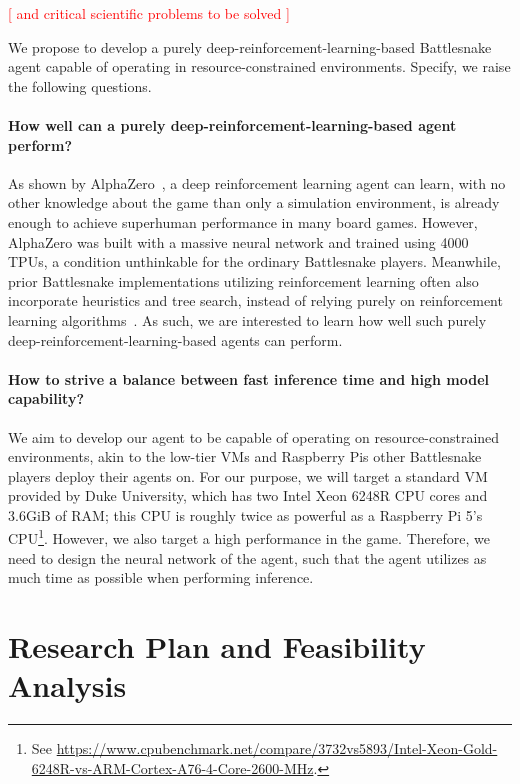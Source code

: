 \documentclass[a4paper]{article}
\newcommand{\todo}[1]{\textcolor{red}{[ #1 ]}}
\begin{document}
\todo{and critical scientific problems to be solved}

We propose to develop a purely deep-reinforcement-learning-based Battlesnake
agent capable of operating in resource-constrained environments. Specify,
we raise the following questions.

\paragraph{How well can a purely deep-reinforcement-learning-based agent
    perform?
} As shown by AlphaZero~\cite{silver2017mastering},
a deep reinforcement learning agent can learn,
with no other knowledge about the game than only a simulation environment,
is already enough to achieve superhuman performance in many board games.
However,
AlphaZero was built with a massive neural network and trained using 4000 TPUs,
a condition unthinkable for the ordinary Battlesnake players. Meanwhile,
prior Battlesnake implementations utilizing reinforcement learning often also
incorporate heuristics and tree search,
instead of relying purely on reinforcement learning
algorithms~\cite{chung2020battlesnake,binnersley2020battlesnake}. As such,
we are interested to learn how well such purely
deep-reinforcement-learning-based agents can perform.

\paragraph{How to strive a balance between fast inference time and high model
    capability?
}
We aim to develop our agent to be capable of operating on resource-constrained
environments,
akin to the low-tier VMs and Raspberry Pis other Battlesnake players deploy
their agents on. For our purpose,
we will target a standard VM provided by Duke University,
which has two Intel Xeon 6248R CPU cores and 3.6GiB of RAM;
this CPU is roughly twice as powerful as a Raspberry Pi 5's CPU\footnote{See
    \url{https://www.cpubenchmark.net/compare/3732vs5893/Intel-Xeon-Gold-6248R-vs-ARM-Cortex-A76-4-Core-2600-MHz}.
}. However, we also target a high performance in the game. Therefore,
we need to design the neural network of the agent,
such that the agent utilizes as much time as possible when performing inference.

\section{Research Plan and Feasibility Analysis}
\end{document}
